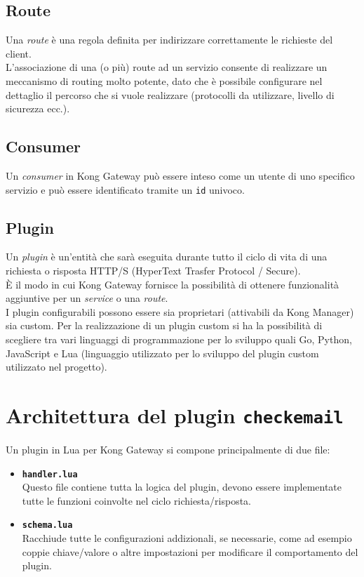 \subsection{Route}\label{sec:kongroute}
Una \emph{route} è una regola definita per indirizzare correttamente le richieste del client.\\
L'associazione di una (o più) route ad un servizio consente di realizzare un meccanismo di routing molto potente, dato che è possibile configurare nel dettaglio il percorso che si vuole realizzare (protocolli da utilizzare, livello di sicurezza ecc.).\\

\subsection{Consumer}\label{sec:kongconsumer}
Un \emph{consumer} in Kong Gateway può essere inteso come un utente di uno specifico servizio e può essere identificato tramite un \texttt{id} univoco.

\subsection{Plugin}\label{sec:kongplugin}
Un \emph{plugin} è un'entità che sarà eseguita durante tutto il ciclo di vita di una richiesta o risposta HTTP/S (HyperText Trasfer Protocol / Secure).\\
È il modo in cui Kong Gateway fornisce la possibilità di ottenere funzionalità aggiuntive per un \emph{service} o una \emph{route}.\\
I plugin configurabili possono essere sia proprietari (attivabili da Kong Manager) sia custom. Per la realizzazione di un plugin custom si ha la possibilità di scegliere tra vari linguaggi di programmazione per lo sviluppo quali Go, Python, JavaScript e Lua (linguaggio utilizzato per lo sviluppo del plugin custom utilizzato nel progetto).\\ 

\section{Architettura del plugin \texttt{checkemail}}\label{sec:architetturaplugin}
Un plugin in Lua per Kong Gateway si compone principalmente di due file:

\begin{itemize}
	\item \textbf{\texttt{handler.lua}}\\ Questo file contiene tutta la logica del plugin, devono essere implementate tutte le funzioni coinvolte nel ciclo richiesta/risposta.
	\item \textbf{\texttt{schema.lua}}\\ Racchiude tutte le configurazioni addizionali, se necessarie, come ad esempio coppie chiave/valore o altre impostazioni per modificare il comportamento del plugin.
\end{itemize}

